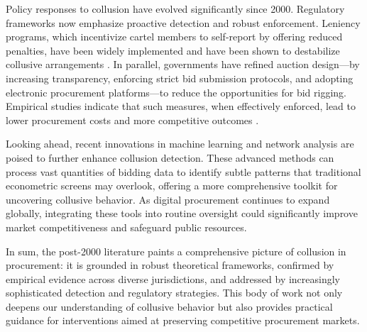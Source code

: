 Policy responses to collusion have evolved significantly since 2000. Regulatory frameworks now emphasize proactive detection and robust enforcement. Leniency programs, which incentivize cartel members to self-report by offering reduced penalties, have been widely implemented and have been shown to destabilize collusive arrangements \citep{oecd2015}. In parallel, governments have refined auction design—by increasing transparency, enforcing strict bid submission protocols, and adopting electronic procurement platforms—to reduce the opportunities for bid rigging. Empirical studies indicate that such measures, when effectively enforced, lead to lower procurement costs and more competitive outcomes \citep{bosio2022public}.

Looking ahead, recent innovations in machine learning and network analysis are poised to further enhance collusion detection. These advanced methods can process vast quantities of bidding data to identify subtle patterns that traditional econometric screens may overlook, offering a more comprehensive toolkit for uncovering collusive behavior. As digital procurement continues to expand globally, integrating these tools into routine oversight could significantly improve market competitiveness and safeguard public resources.

In sum, the post-2000 literature paints a comprehensive picture of collusion in procurement: it is grounded in robust theoretical frameworks, confirmed by empirical evidence across diverse jurisdictions, and addressed by increasingly sophisticated detection and regulatory strategies. This body of work not only deepens our understanding of collusive behavior but also provides practical guidance for interventions aimed at preserving competitive procurement markets.
